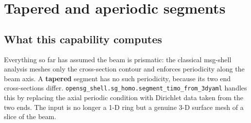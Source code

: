 \section{Tapered and aperiodic segments}
\label{sec:shell-segment}

\subsection{What this capability computes}

Everything so far has assumed the beam is prismatic: the classical msg-shell
analysis meshes only the cross-section contour and enforces periodicity along the
beam axis. A \textbf{tapered} segment has no such periodicity, because its two end
cross-sections differ. \texttt{opensg\_shell.sg\_homo.segment\_timo\_from\_3dyaml}
handles this by replacing the axial periodic condition with Dirichlet data taken
from the two ends. The input is no longer a 1-D ring but a genuine 3-D surface
mesh of a slice of the beam.

